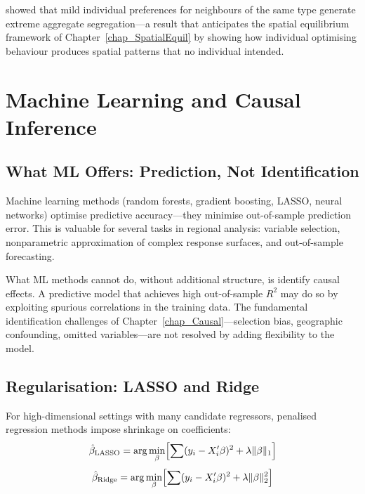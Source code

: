 \citet{Schelling1971} showed that mild individual preferences for neighbours
of the same type generate extreme aggregate segregation---a result that
anticipates the spatial equilibrium framework of Chapter~\ref{chap_SpatialEquil}
by showing how individual optimising behaviour produces spatial patterns that
no individual intended.



\section{Machine Learning and Causal Inference}
\label{sec_ML}

\subsection{What ML Offers: Prediction, Not Identification}

Machine learning methods (random forests, gradient boosting, LASSO, neural
networks) optimise predictive accuracy---they minimise out-of-sample
prediction error. This is valuable for several tasks in regional analysis:
variable selection, nonparametric approximation of complex response surfaces,
and out-of-sample forecasting.

What ML methods cannot do, without additional structure, is identify causal
effects. A predictive model that achieves high out-of-sample $R^2$ may do so
by exploiting spurious correlations in the training data. The fundamental
identification challenges of Chapter~\ref{chap_Causal}---selection bias,
geographic confounding, omitted variables---are not resolved by adding
flexibility to the model.

\subsection{Regularisation: LASSO and Ridge}

For high-dimensional settings with many candidate regressors, penalised
regression methods impose shrinkage on coefficients:
\begin{equation}
  \hat\beta_\text{LASSO} = \arg\min_\beta \Bigl[
    \sum(y_i - X_i'\beta)^2 + \lambda\|\beta\|_1
  \Bigr]
\end{equation}
\begin{equation}
  \hat\beta_\text{Ridge} = \arg\min_\beta \Bigl[
    \sum(y_i - X_i'\beta)^2 + \lambda\|\beta\|_2^2
  \Bigr]
\end{equation}


